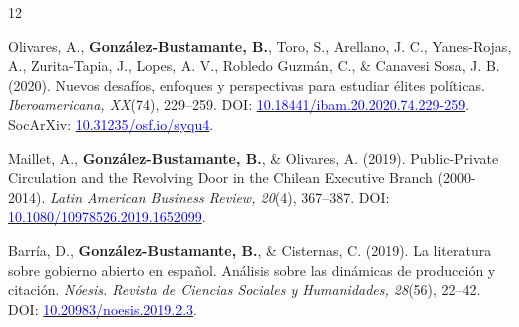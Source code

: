 \begin{publications}
\begin{benumerate}{12}
\item{ Olivares, A., {\bfseries González-Bustamante, B.}, Toro, S., Arellano, J. C., Yanes-Rojas, A., Zurita-Tapia, J., Lopes, A. V., Robledo Guzmán, C., \& Canavesi Sosa, J. B. (2020). Nuevos desafíos, enfoques y perspectivas para estudiar élites políticas. {\itshape Iberoamericana, XX}(74), 229--259. DOI: \href{https://doi.org/10.18441/ibam.20.2020.74.229-259}{\textcolor{blue}{10.18441/ibam.20.2020.74.229-259}}. SocArXiv: \href{https://doi.org/10.31235/osf.io/syqu4}{\textcolor{blue}{10.31235/osf.io/syqu4}}.}\vspace{1mm}

\item{Maillet, A., {\bfseries González-Bustamante, B.}, \& Olivares, A. (2019). Public-Private Circulation and the Revolving Door in the Chilean Executive Branch (2000-2014). {\itshape Latin American Business Review, 20}(4), 367--387. DOI: \href{https://doi.org/10.1080/10978526.2019.1652099}{\textcolor{blue}{10.1080/10978526.2019.1652099}}.}\vspace{1mm}


\item{Barría, D., {\bfseries González-Bustamante, B.}, \& Cisternas, C. (2019). La literatura sobre gobierno abierto en español. Análisis sobre las dinámicas de producción y citación. {\itshape Nóesis. Revista de Ciencias Sociales y Humanidades, 28}(56), 22--42. DOI: \href{http://dx.doi.org/10.20983/noesis.2019.2.3}{\textcolor{blue}{10.20983/noesis.2019.2.3}}.}\vspace{1mm}



\end{benumerate}
\end{publications}
